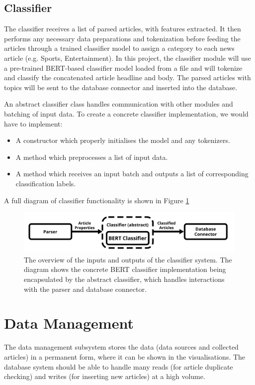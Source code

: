 \documentclass{l4proj}
\begin{document}
\subsection{Classifier}
The classifier receives a list of parsed articles, with features extracted. It then performs any necessary data preparations and tokenization before feeding the articles through a trained classifier model to assign a category to each news article (e.g. Sports, Entertainment). In this project, the classifier module will use a pre-trained BERT-based classifier model loaded from a file and will tokenize and classify the concatenated article headline and body. The parsed articles with topics will be sent to the database connector and inserted into the database. \par
An abstract classifier class handles communication with other modules and batching of input data. To create a concrete classifier implementation, we would have to implement:
\begin{itemize}
    \item A constructor which properly initialises the model and any tokenizers.
    \item A method which preprocesses a list of input data.
    \item A method which receives an input batch and outputs a list of corresponding classification labels.
\end{itemize}
A full diagram of classifier functionality is shown in Figure \ref{fig:classifier_diagram}
 \begin{figure}[h]
\centering
\includegraphics[width=\textwidth]{images/Classifier-diagram.png}
\caption{The overview of the inputs and outputs of the classifier system. The diagram shows the concrete BERT classifier implementation being encapsulated by the abstract classifier, which handles interactions with the parser and database connector.}
\label{fig:classifier_diagram}
\end{figure}

\section{Data Management}
The data management subsystem stores the data (data sources and collected articles) in a permanent form, where it can be shown in the visualisations. The database system should be able to handle many reads (for article duplicate checking) and writes (for inserting new articles) at a high volume. 
\end{document}
